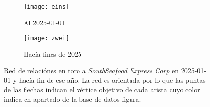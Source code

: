 \documentclass[11pt,spanish,a4paper]{article}
\begin{document}
\begin{figure}[!ht]
	\centering
	\begin{subfigure}[b]{\textwidth}
		\centering
		\texttt{[image: eins]}
		\caption{Al 2025-01-01}
		\label{fig:antes}
	\end{subfigure}
	\begin{subfigure}[b]{\textwidth}
		\centering
		\texttt{[image: zwei]}
		\caption{Hacía fines de 2025}
		\label{fig:después}
	\end{subfigure}
	\caption{
		Red de relaciónes en toro a \emph{SouthSeafood Express Corp} en 2025-01-01 y hacía fin de ese año.
		La red es orientada por lo que las puntas de las flechas indican el vértice objetivo de cada arista cuyo color indica en apartado de la base de datos figura.
		}
	\label{fig:Networkx}
\end{figure}


\printbibliography[heading=bibintoc] %
\end{document}
